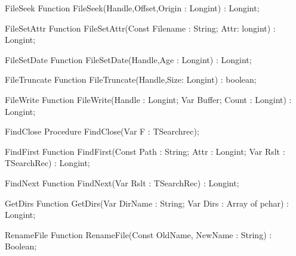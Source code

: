  
\begin{function}{FileSeek}
\Declaration
Function FileSeek(Handle,Offset,Origin : Longint) : Longint;
\Description
\Errors
\SeeAlso
\end{function}

 
\begin{function}{FileSetAttr}
\Declaration
Function FileSetAttr(Const Filename : String; Attr: longint) : Longint;
\Description
\Errors
\SeeAlso
\end{function}

 
\begin{function}{FileSetDate}
\Declaration
Function FileSetDate(Handle,Age : Longint) : Longint;
\Description
\Errors
\SeeAlso
\end{function}

 
\begin{function}{FileTruncate}
\Declaration
Function FileTruncate(Handle,Size: Longint) : boolean;
\Description
\Errors
\SeeAlso
\end{function}

 
\begin{function}{FileWrite}
\Declaration
Function FileWrite(Handle : Longint; Var Buffer; Count : Longint) : Longint;
\Description
\Errors
\SeeAlso
\end{function}

 
\begin{procedure}{FindClose}
\Declaration
Procedure FindClose(Var F : TSearchrec);
\Description
\Errors
\SeeAlso
\end{procedure}

 
\begin{function}{FindFirst}
\Declaration
Function FindFirst(Const Path : String; Attr : Longint; Var Rslt : TSearchRec) : Longint;
\Description
\Errors
\SeeAlso
\end{function}

 
\begin{function}{FindNext}
\Declaration
Function FindNext(Var Rslt : TSearchRec) : Longint;
\Description
\Errors
\SeeAlso
\end{function}

 
\begin{function}{GetDirs}
\Declaration
Function GetDirs(Var DirName : String; Var Dirs : Array of pchar) : Longint; 
\Description
\Errors
\SeeAlso
\end{function}

 
\begin{function}{RenameFile}
\Declaration
Function RenameFile(Const OldName, NewName : String) : Boolean;
\Description
\Errors
\SeeAlso
\end{function}

